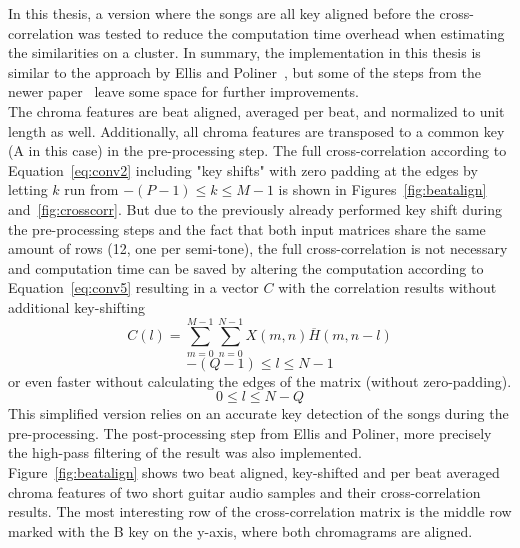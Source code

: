 In this thesis, a version where the songs are all key aligned before the cross-correlation was tested to reduce the computation time overhead when estimating the similarities on a cluster. 
In summary, the implementation in this thesis is similar to the approach by Ellis and Poliner~\cite{chroma3}, but some of the steps from the newer paper~\cite{cover802} leave some space for further improvements.\\ The chroma features are beat aligned, averaged per beat, and normalized to unit length as well. Additionally, all chroma features are transposed to a common key (A in this case) in the pre-processing step. The full cross-correlation according to Equation~\eqref{eq:conv2} including "key shifts" with zero padding at the edges by letting $k$ run from $-(P - 1) \leq k \leq M - 1$ is shown in Figures~\ref{fig:beatalign} and~\ref{fig:crosscorr}. But due to the previously already performed key shift during the pre-processing steps and the fact that both input matrices share the same amount of rows (12, one per semi-tone), the full cross-correlation is not necessary and computation time can be saved by altering the computation according to Equation~\eqref{eq:conv5} resulting in a vector $C$ with the correlation results without additional key-shifting
\begin{equation} \label{eq:conv5}
C(l) = \sum_{m = 0}^{M - 1}{\sum_{n = 0}^{N - 1}{X(m, n)\overline{H}(m, n - l)}}
\end{equation}
\begin{equation} \label{eq:conv6}
-(Q - 1) \leq l \leq N - 1
\end{equation}
or even faster without calculating the edges of the matrix (without zero-padding).
\begin{equation} \label{eq:conv7}
0 \leq l \leq N - Q
\end{equation}
\noindent This simplified version relies on an accurate key detection of the songs during the pre-processing. The post-processing step from Ellis and Poliner, more precisely the high-pass filtering of the result was also implemented.\\
Figure~\ref{fig:beatalign} shows two beat aligned, key-shifted and per beat averaged chroma features of two short guitar audio samples and their cross-correlation results. The most interesting row of the cross-correlation matrix is the middle row marked with the B key on the y-axis, where both chromagrams are aligned. %
